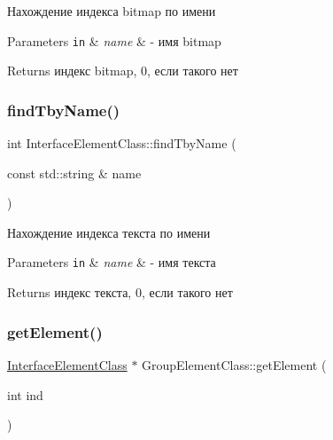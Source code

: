 Нахождение индекса bitmap по имени 


\begin{DoxyParams}[1]{Parameters}
\mbox{\tt in}  & {\em name} & -\/ имя bitmap \\
\hline
\end{DoxyParams}
\begin{DoxyReturn}{Returns}
индекс bitmap, 0, если такого нет 
\end{DoxyReturn}
\mbox{\label{class_interface_element_class_a2d7805e3c6f80068b76618e3ad43f31f}} 
\subsubsection{\texorpdfstring{find\+Tby\+Name()}{findTbyName()}}
{\footnotesize\ttfamily int Interface\+Element\+Class\+::find\+Tby\+Name (\begin{DoxyParamCaption}\item[{const std\+::string \&}]{name }\end{DoxyParamCaption})\hspace{0.3cm}{\ttfamily [inherited]}}



Нахождение индекса текста по имени 


\begin{DoxyParams}[1]{Parameters}
\mbox{\tt in}  & {\em name} & -\/ имя текста \\
\hline
\end{DoxyParams}
\begin{DoxyReturn}{Returns}
индекс текста, 0, если такого нет 
\end{DoxyReturn}
\mbox{\label{class_group_element_class_ac30e4152465fa8409dfe3bf38e75cce7}} 
\subsubsection{\texorpdfstring{get\+Element()}{getElement()}}
{\footnotesize\ttfamily \hyperlink{class_interface_element_class}{Interface\+Element\+Class} $\ast$ Group\+Element\+Class\+::get\+Element (\begin{DoxyParamCaption}\item[{int}]{ind }\end{DoxyParamCaption})\hspace{0.3cm}{\ttfamily [virtual]}}



